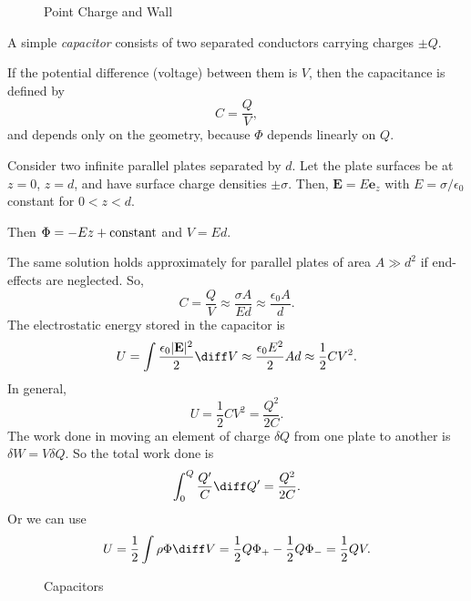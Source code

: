 \documentclass[12pt]{article}
\begin{document}
\begin{figure}[h]
	\centering
	\caption{Point Charge and Wall}
	\label{fig:point_charge_and_wall}
\end{figure}

A simple \emph{capacitor} consists of two separated conductors carrying charges $\pm Q$.

If the potential difference (voltage) between them is $V$, then the capacitance is defined by
\[
C = \frac{Q}{V}
,\]
and depends only on the geometry, because $\Phi$ depends linearly on $Q$.

\begin{exbox}
	Consider two infinite parallel plates separated by $d$. Let the plate surfaces be at $z = 0$, $z = d$, and have surface charge densities $\pm \sigma$. Then, $\mathbf{E} = E \mathbf{e}_z$ with $E = \sigma/\epsilon_0$ constant for $0 < z < d$.

	Then $\Phi = - Ez + \rm{constant}$ and $V = Ed$.

	The same solution holds approximately for parallel plates of area $A \gg d^2$ if end-effects are neglected. So,
	\[
	C = \frac{Q}{V} \approx \frac{\sigma A}{E d} \approx \frac{\epsilon_0 A}{d}
	.\]
	The electrostatic energy stored in the capacitor is
	\[
	U = \int \frac{\epsilon_0 |\mathbf{E}|^2}{2} \diff V \approx \frac{\epsilon_0 E^2}{2} A d \approx \frac{1}{2} CV^2
	.\]
	In general,
	\[
	U = \frac{1}{2} CV^2 = \frac{Q^2}{2C}
	.\]
	The work done in moving an element of charge $\delta Q$ from one plate to another is $\delta W = V \delta Q$. So the total work done is
	\[
	\int_{0}^{Q} \frac{Q'}{C} \diff Q' = \frac{Q^2}{2C}
	.\]
	Or we can use
	\[
	U = \frac{1}{2} \int \rho \Phi \diff V = \frac{1}{2} Q \Phi_{+} - \frac{1}{2} Q \Phi_{-} = \frac{1}{2} Q V
	.\]
\end{exbox}

\begin{figure}[h]
	\centering
	\caption{Capacitors}
	\label{fig:capacitors}
\end{figure}
\end{document}
